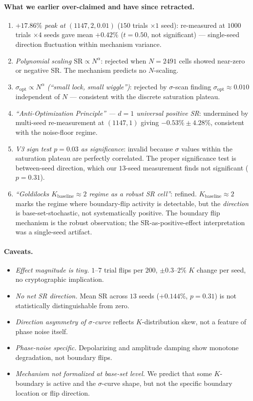 \documentclass[11pt]{article}
\begin{document}
\paragraph{What we earlier over-claimed and have since retracted.}
\begin{enumerate}
  \item \emph{$+17.86\%$ peak at $(1147, 2, 0.01)$} ($150$ trials $\times 1$ seed): re-measured at $1000$ trials $\times 4$ seeds gave mean $+0.42\%$ ($t = 0.50$, not significant) --- single-seed direction fluctuation within mechanism variance.
  \item \emph{Polynomial scaling $\text{SR} \propto N^\alpha$}: rejected when $N = 2491$ cells showed near-zero or negative SR. The mechanism predicts no $N$-scaling.
  \item \emph{$\sigma_{\text{opt}} \propto N^\alpha$ (``small lock, small wiggle'')}: rejected by $\sigma$-scan finding $\sigma_{\text{opt}} \approx 0.010$ independent of $N$ --- consistent with the discrete saturation plateau.
  \item \emph{``Anti-Optimization Principle'' --- $d = 1$ universal positive SR}: undermined by multi-seed re-measurement at $(1147, 1)$ giving $-0.53\% \pm 4.28\%$, consistent with the noise-floor regime.
  \item \emph{V3 sign test $p = 0.03$ as significance}: invalid because $\sigma$ values within the saturation plateau are perfectly correlated. The proper significance test is between-seed direction, which our $13$-seed measurement finds not significant ($p = 0.31$).
  \item \emph{``Goldilocks $K_{\text{baseline}} \approx 2$ regime as a robust SR cell''}: refined. $K_{\text{baseline}} \approx 2$ marks the regime where boundary-flip activity is detectable, but the \emph{direction} is base-set-stochastic, not systematically positive. The boundary flip mechanism is the robust observation; the SR-as-positive-effect interpretation was a single-seed artifact.
\end{enumerate}

\paragraph{Caveats.}
\begin{itemize}
  \item \emph{Effect magnitude is tiny.} $1$--$7$ trial flips per $200$, $\pm 0.3$--$2\%$ $K$ change per seed, no cryptographic implication.
  \item \emph{No net SR direction.} Mean SR across $13$ seeds ($+0.144\%$, $p = 0.31$) is not statistically distinguishable from zero.
  \item \emph{Direction asymmetry of $\sigma$-curve} reflects $K$-distribution skew, not a feature of phase noise itself.
  \item \emph{Phase-noise specific.} Depolarizing and amplitude damping show monotone degradation, not boundary flips.
  \item \emph{Mechanism not formalized at base-set level.} We predict that some $K$-boundary is active and the $\sigma$-curve shape, but not the specific boundary location or flip direction.
\end{itemize}
\end{document}
